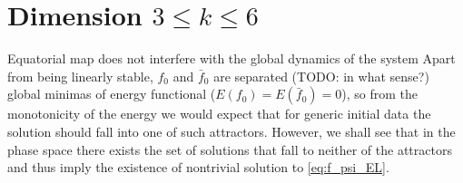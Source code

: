 \section*{Dimension $3\le k\le6$}

Equatorial map does not interfere with the global dynamics of the
system Apart from being linearly stable, $f_0$ and $\bar{f}_0$ are
separated (TODO: in what sense?) global minimas of energy functional
($E(f_0)=E(\bar{f}_0)=0$), so from the monotonicity of the energy we
would expect that for generic initial data the solution should fall
into one of such attractors. However, we shall see that in the phase
space there exists the set of solutions that fall to neither of the
attractors and thus imply the existence of nontrivial solution to
\eqref{eq:f_psi_EL}.


